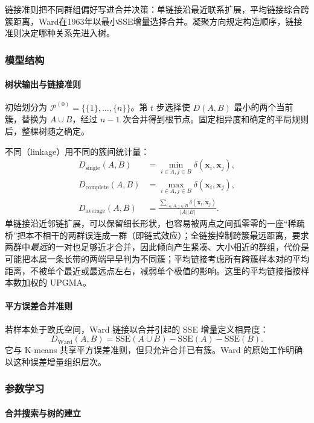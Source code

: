 链接准则把不同群组偏好写进合并决策：单链接沿最近联系扩展，平均链接综合跨簇距离，Ward在1963年以最小SSE增量选择合并。凝聚方向规定构造顺序，链接准则决定哪种关系先进入树。

\subsubsection{模型结构}

\paragraph{树状输出与链接准则}

初始划分为 $\mathcal{P}^{(0)}=\{\{1\},\ldots,\{n\}\}$。第 $t$ 步选择使 $D(A,B)$ 最小的两个当前簇，替换为 $A\cup B$，经过 $n-1$ 次合并得到根节点。固定相异度和确定的平局规则后，整棵树随之确定。

不同（linkage）用不同的簇间统计量：
\begin{align*}
 D_{\mathrm{single}}(A,B)
   &=\min_{i\in A,j\in B}\delta(\bm{x}_i,\bm{x}_j),\\
 D_{\mathrm{complete}}(A,B)
   &=\max_{i\in A,j\in B}\delta(\bm{x}_i,\bm{x}_j),\\
 D_{\mathrm{average}}(A,B)
   &=\frac{\sum_{i\in A,j\in B}\delta(\bm{x}_i,\bm{x}_j)}
   {|A||B|}.
\end{align*}
单链接沿近邻链扩展，可以保留细长形状，也容易被两点之间孤零零的一座“稀疏桥”把本不相干的两群误连成一群（即链式效应）；全链接控制跨簇最远距离，要求两群中\emph{最远}的一对也足够近才合并，因此倾向产生紧凑、大小相近的群组，代价是可能把本属一条长带的两端早早判为不同簇；平均链接考虑所有跨簇样本对的平均距离，不被单个最近或最远点左右，减弱单个极值的影响。这里的平均链接指按样本数加权的 UPGMA。

\paragraph{平方误差合并准则}

若样本处于欧氏空间，Ward 链接以合并引起的 SSE 增量定义相异度：
\[
 D_{\mathrm{Ward}}(A,B)
 =\mathrm{SSE}(A\cup B)-\mathrm{SSE}(A)-\mathrm{SSE}(B).
\]
它与 K-means 共享平方误差准则，但只允许合并已有簇。Ward 的原始工作明确以这种误差增量组织层次。

\subsubsection{参数学习}

\paragraph{合并搜索与树的建立}

